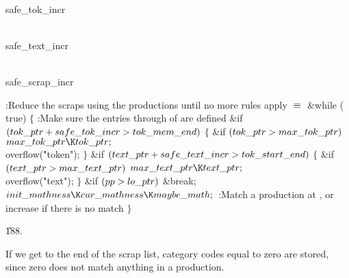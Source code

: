 \Y\B\4\D\\{safe\_tok\_incr}\5
\par
\B\4\D\\{safe\_text\_incr}\5
\par
\B\4\D\\{safe\_scrap\_incr}\5
\par
\Y\B\4:Reduce the scraps using the productions until no more rules apply%
\X${}\equiv{}$\6
\&{while} (\\{true})\5
${}\{{}$\1\6
:Make sure the entries  through  of  are defined\X\6
\&{if} ${}(\\{tok\_ptr}+\\{safe\_tok\_incr}>\\{tok\_mem\_end}){}$\5
${}\{{}$\1\6
\&{if} ${}(\\{tok\_ptr}>\\{max\_tok\_ptr}){}$\1\5
${}\\{max\_tok\_ptr}\K\\{tok\_ptr};{}$\2\6
\\{overflow}(\.{"token"});\6
\4${}\}{}$\2\6
\&{if} ${}(\\{text\_ptr}+\\{safe\_text\_incr}>\\{tok\_start\_end}){}$\5
${}\{{}$\1\6
\&{if} ${}(\\{text\_ptr}>\\{max\_text\_ptr}){}$\1\5
${}\\{max\_text\_ptr}\K\\{text\_ptr};{}$\2\6
\\{overflow}(\.{"text"});\6
\4${}\}{}$\2\6
\&{if} ${}(\\{pp}>\\{lo\_ptr}){}$\1\5
\&{break};\2\6
${}\\{init\_mathness}\K\\{cur\_mathness}\K\\{maybe\_math};{}$\6
:Match a production at , or increase  if there is no
match\X\6
\4${}\}{}$\2\par
\U188.\fi

If we get to the end of the scrap list, category codes equal to zero are
stored, since zero does not match anything in a production.

